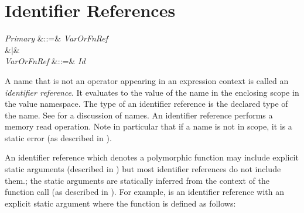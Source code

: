 %
%
%
%

\section{Identifier References}

\begin{Grammar}
\emph{Primary}
&::=& \emph{VarOrFnRef}\\
&$|$&  \\

\emph{VarOrFnRef} &::=& \emph{Id} \\

\end{Grammar}

A name that is not an operator appearing in an expression context is called
  an \emph{identifier reference}.
It evaluates to the value of the name in the enclosing scope in the value
  namespace.  The type of an identifier reference is the declared type of
  the name.
See  for a discussion of names.
An identifier reference performs a memory read operation.
Note in particular that if a name is not in scope,
it is a static error (as described in ).

An identifier reference which denotes a polymorphic function
may include explicit static arguments
(described in )
but most identifier references do not include them.; the static arguments
are statically inferred from the context of the function call
(as described in ).
For example,
 is an identifier
reference with an explicit static argument where the function
 is defined as follows:



